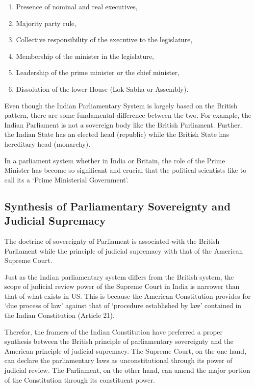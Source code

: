 \renewcommand{\labelenumi}{\textbf{(\alph{enumi})}}
\begin{enumerate}
  \item Presence of nominal and real executives,
  \item Majority party rule,
  \item Collective responsibility of the executive to the legislature,
  \item Membership of the minister in the legislature,
  \item Leadership of the prime minister or the chief minister,
  \item Dissolution of the lower House (Lok Sabha or Assembly).
\end{enumerate}

Even though the Indian Parliamentary System is largely based on the British pattern, there are some fundamental difference between the two. For example, the Indian Parliament is not a sovereign body like the British Parliament. Further, the Indian State has an elected head (republic) while the British State has hereditary head (monarchy).

In a parliament system whether in India or Britain, the role of the Prime Minister has become so significant and crucial that the political scientists like to call its a `Prime Ministerial Government'.

\subsection{Synthesis of Parliamentary Sovereignty and Judicial Supremacy}

The doctrine of sovereignty of Parliament is associated with the British Parliament while the principle of judicial supremacy with that of the American Supreme Court.

Just as the Indian parliamentary system differs from the British system, the scope of judicial review power of the Supreme Court in India is narrower than that of what exists in US. This is because the American Constitution provides for `due process of law' against that of `procedure established by law' contained in the Indian Constitution (Article 21).

Therefor, the framers of the Indian Constitution have preferred a proper synthesis between the British principle of parliamentary sovereignty and the American principle of judicial supremacy. The Supreme Court, on the one hand, can declare the parliamentary laws as unconstitutional through its power of judicial review. The Parliament, on the other hand, can amend the major portion of the Constitution through its constituent power.

